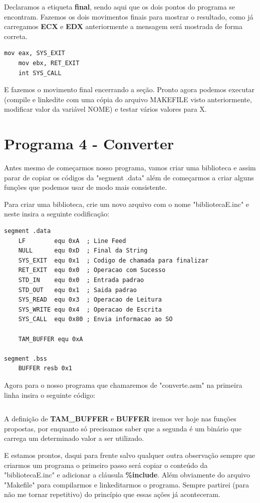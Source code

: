 Declaramos a etiqueta \textbf{final}, sendo aqui que os dois pontos do programa se encontram. Fazemos os dois movimentos finais para mostrar o resultado, como já carregamos \textbf{ECX} e \textbf{EDX} anteriormente a mensagem será mostrada de forma correta.

\begin{lstlisting}[]
	mov eax, SYS_EXIT
	mov ebx, RET_EXIT
	int SYS_CALL 
\end{lstlisting}

E fazemos o movimento final encerrando a seção. Pronto agora podemos executar (compile e linkedite com uma cópia do arquivo MAKEFILE visto anteriormente, modificar valor da variável NOME) e testar vários valores para X.

\section{Programa 4 - Converter}
Antes mesmo de começarmos nosso programa, vamos criar uma biblioteca e assim parar de copiar os códigos da "segment .data" além de começarmos a criar alguns funções que podemos usar de modo mais consistente.

Para criar uma biblioteca, crie um novo arquivo com o nome "bibliotecaE.inc" e neste insira a seguinte codificação:
\begin{lstlisting}[]
segment .data
	LF        equ 0xA  ; Line Feed
	NULL      equ 0xD  ; Final da String
	SYS_EXIT  equ 0x1  ; Codigo de chamada para finalizar
	RET_EXIT  equ 0x0  ; Operacao com Sucesso
	STD_IN    equ 0x0  ; Entrada padrao
	STD_OUT   equ 0x1  ; Saida padrao
	SYS_READ  equ 0x3  ; Operacao de Leitura
	SYS_WRITE equ 0x4  ; Operacao de Escrita
	SYS_CALL  equ 0x80 ; Envia informacao ao SO

  	TAM_BUFFER equ 0xA

segment .bss
	BUFFER resb 0x1
\end{lstlisting}

Agora para o nosso programa que chamaremos de "converte.asm" na primeira linha insira o seguinte código:
\begin{lstlisting}[]
%include 'bibliotecaE.inc'
\end{lstlisting}

A definição de \textbf{TAM\_BUFFER} e \textbf{BUFFER} iremos ver hoje nas funções propostas, por enquanto só precisamos saber que a segunda é um binário que carrega um determinado valor a ser utilizado.

E estamos prontos, daqui para frente salvo qualquer outra observação sempre que criarmos um programa o primeiro passo será copiar o conteúdo da "bibliotecaE.inc" e adicionar a cláusula \textbf{\%include}. Além obviamente do arquivo "Makefile" para compilarmos e linkeditarmos o programa. Sempre partirei (para não me tornar repetitivo) do princípio que essas ações já aconteceram.


